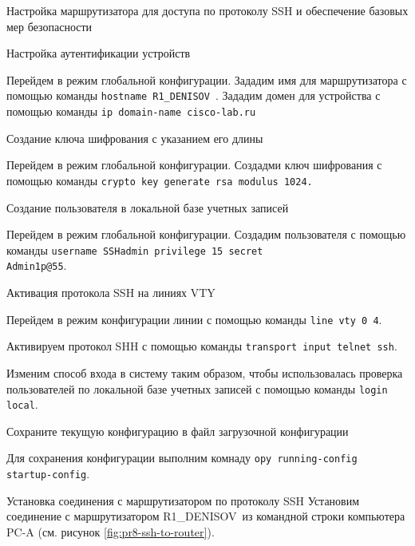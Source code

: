\documentclass[a4paper,14pt]{extarticle}
\newcommand{\router}{R1\_DENISOV~}
\begin{document}
\begin{mypart}{Настройка маршрутизатора для доступа по протоколу SSH и
		обеспечение базовых мер безопасности}
	\begin{step}{Настройка аутентификации устройств}
		
		Перейдем в режим глобальной конфигурации.
		Зададим имя для маршрутизатора с помощью команды \texttt{hostname \router}.
		Зададим домен для устройства с помощью команды \texttt{ip domain-name cisco-lab.ru}
	\end{step}

	\begin{step}{Создание ключа шифрования с указанием его длины}
		
		Перейдем в режим глобальной конфигурации.
		Создадми ключ шифрования с помощью команды \texttt{crypto key generate rsa modulus 1024.}
	\end{step}

\begin{step}{Создание пользователя в локальной базе учетных записей}
	
	Перейдем в режим глобальной конфигурации.
	Создадим пользователя с помощью команды \texttt{username SSHadmin privilege 15 secret \\ Admin1p@55}.
\end{step}

\begin{step}{Активация протокола SSH на линиях VTY}
	
	Перейдем в режим конфигурации линии с помощью команды \texttt{line vty 0 4}.
	
	Активируем протокол SHH с помощью команды \texttt{transport input telnet ssh}.
	
	Изменим способ входа в систему таким образом, чтобы использовалась проверка пользователей
	по локальной базе учетных записей с помощью команды \texttt{login local}.
	
\end{step}

\begin{step}{Сохраните текущую конфигурацию в файл загрузочной конфигурации}
	
	Для сохранения конфигурации выполним комнаду \texttt{opy running-config startup-config}.
\end{step}

\begin{step}{Установка соединения с маршрутизатором по протоколу SSH}
	Установим соединение с маршрутизатором \router из командной строки компьютера PC-A (см. рисунок \ref{fig:pr8-ssh-to-router}).
	

\end{step}
\end{mypart}
\end{document}
